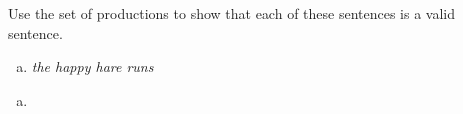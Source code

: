 \documentclass[../main.tex]{subfiles}
\begin{document}
Use the set of productions to show that each of these sentences is a valid sentence.
\begin{enumerate}[a)]
	\item {\it the happy hare runs}
\end{enumerate}

\solution
\begin{enumerate}[a)]
	\item  
\end{enumerate}
\end{document}
